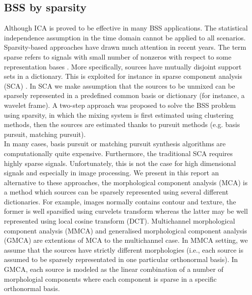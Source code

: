 \subsection{BSS by sparsity}
Although ICA is proved to be effective in many BSS applications. The statistical independence assumption in the time domain cannot be applied to all scenarios. Sparsity-based approaches have drawn much attention in recent years. The term sparse refers to signals with small number of nonzeros with respect to some representation bases \cite{ZibulevskyMichael2001BSSb}. More specifically, sources have mutually disjoint support sets in a dictionary. This is exploited for instance in sparse component analysis (SCA) \cite{SCA2005}. In SCA we make assumption that the sources to be unmixed can be sparsely represented in a predefined common basis or dictionary (for instance, a wavelet frame). A two-step approach \cite{BOFILL20012353} was proposed to solve the BSS problem using sparsity, in which the mixing system is first estimated using clustering methods, then the sources are estimated thanks to pursuit methods (e.g. basis pursuit, matching pursuit).\\

In many cases, basis pursuit or matching pursuit synthesis algorithms are computationally quite expensive. Furthermore, the traditional SCA requires highly sparse signals. Unfortunately, this is not the case for high dimensional signals and especially in image processing. We present in this report an alternative to these approaches, the morphological component analysis (MCA) \cite{BobinJ_2007SaMD, BobinJ_2006Mdas} is a method which sources can be sparsely represented using several different dictionaries. For example, images normally contains contour and texture, the former is well sparsified using curvelets transform whereas the latter may be well represented using local cosine transform (DCT). 
Multichannel morphological component analysis (MMCA) \cite{Starck2005MorphologicalCA} and generalised morphological component analysis (GMCA) are extentions of MCA to the multichannel case. In MMCA setting, we assume that the sources have strictly different morphologies (i.e., each source is assumed to be sparsely representated in one particular orthonormal basis). In GMCA, each source is modeled as the linear combination of a number of morphologial components where each component is sparse in a specific orthonormal basis. 

